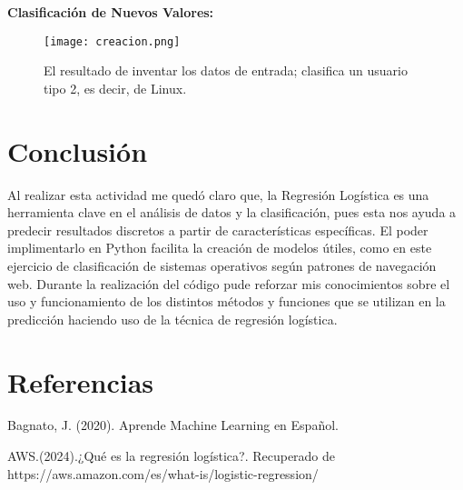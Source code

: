 \documentclass{pssbmac}
\begin{document}
\textbf{Clasificación de Nuevos Valores:}

\begin{figure}[H]
\centering
\texttt{[image: creacion.png]}
\caption{ {\small El resultado de inventar los datos de entrada; clasifica un usuario tipo 2, es decir, de Linux.}}
\label{figura13}
\end{figure}



\section{Conclusión}
Al realizar esta actividad me quedó claro que, la Regresión Logística es una herramienta clave en el análisis de datos y la clasificación, pues esta nos ayuda a predecir resultados discretos a partir de características específicas. El poder implimentarlo en Python facilita la creación de modelos útiles, como en este ejercicio de clasificación de sistemas operativos según patrones de navegación web. Durante la realización del código pude reforzar mis conocimientos sobre el uso y funcionamiento de los distintos métodos y funciones que se utilizan en la predicción haciendo uso de la técnica de regresión logística.

\section{Referencias}
Bagnato, J. (2020). Aprende Machine Learning en Español.

AWS.(2024).¿Qué es la regresión logística?.
Recuperado de https://aws.amazon.com/es/what-is/logistic-regression/
\end{document}
